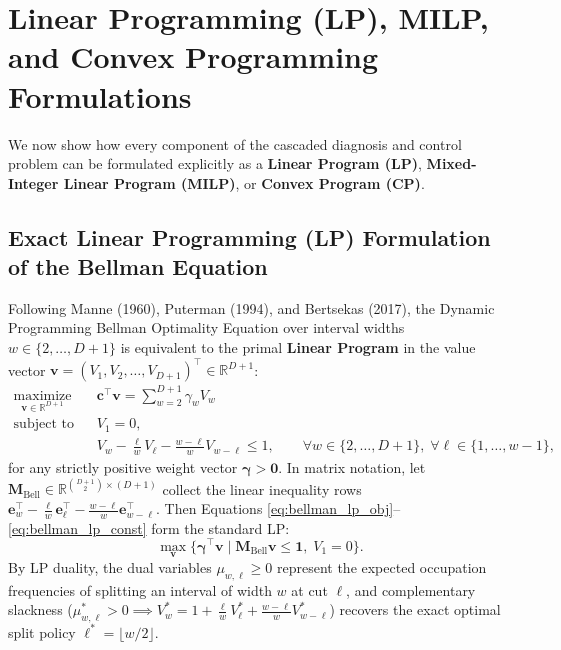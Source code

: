 \documentclass[11pt,a4paper]{article}
\theoremstyle{definition}
\theoremstyle{remark}
\begin{document}
\section{Linear Programming (LP), MILP, and Convex Programming Formulations}

We now show how every component of the cascaded diagnosis and control problem can be formulated explicitly as a \textbf{Linear Program (LP)}, \textbf{Mixed-Integer Linear Program (MILP)}, or \textbf{Convex Program (CP)}.

\subsection{Exact Linear Programming (LP) Formulation of the Bellman Equation}

Following Manne (1960), Puterman (1994), and Bertsekas (2017), the Dynamic Programming Bellman Optimality Equation over interval widths $w \in \{2, \dots, D+1\}$ is equivalent to the primal \textbf{Linear Program} in the value vector $\bm{v} = (V_1, V_2, \dots, V_{D+1})^\top \in \mathbb{R}^{D+1}$:
\begin{align}
    \underset{\bm{v} \in \mathbb{R}^{D+1}}{\text{maximize}} \quad & \bm{c}^\top \bm{v} = \sum_{w=2}^{D+1} \gamma_w V_w \label{eq:bellman_lp_obj}\\
    \text{subject to} \quad & V_1 = 0, \nonumber\\
    & V_w - \frac{\ell}{w} V_\ell - \frac{w - \ell}{w} V_{w - \ell} \le 1, \qquad \forall w \in \{2, \dots, D+1\}, \; \forall \ell \in \{1, \dots, w-1\}, \label{eq:bellman_lp_const}
\end{align}
for any strictly positive weight vector $\bm{\gamma} > \bm{0}$. In matrix notation, let $\mathbf{M}_{\text{Bell}} \in \mathbb{R}^{\binom{D+1}{2} \times (D+1)}$ collect the linear inequality rows $\bm{e}_w^\top - \frac{\ell}{w}\bm{e}_\ell^\top - \frac{w-\ell}{w}\bm{e}_{w-\ell}^\top$. Then Equations \eqref{eq:bellman_lp_obj}--\eqref{eq:bellman_lp_const} form the standard LP:
\begin{equation}
    \max_{\bm{v}} \big\{ \bm{\gamma}^\top \bm{v} \;\big|\; \mathbf{M}_{\text{Bell}} \bm{v} \le \bm{1}, \; V_1 = 0 \big\}.
\end{equation}
By LP duality, the dual variables $\mu_{w,\ell} \ge 0$ represent the expected occupation frequencies of splitting an interval of width $w$ at cut $\ell$, and complementary slackness ($\mu_{w,\ell}^* > 0 \implies V_w^* = 1 + \frac{\ell}{w}V_\ell^* + \frac{w-\ell}{w}V_{w-\ell}^*$) recovers the exact optimal split policy $\ell^* = \lfloor w/2 \rfloor$.
\end{document}
